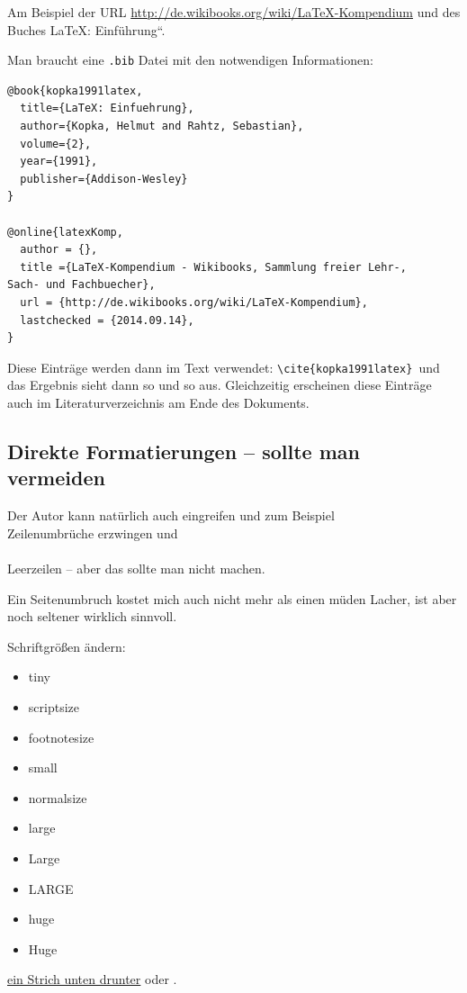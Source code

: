 Am Beispiel der URL \url{http://de.wikibooks.org/wiki/LaTeX-Kompendium}
und des Buches \quotedblbase \LaTeX{}: Einführung``.

Man braucht eine \texttt{.bib} Datei mit den notwendigen Informationen:

\begin{lstlisting}[language={[LaTeX]TeX}]
@book{kopka1991latex,
  title={LaTeX: Einfuehrung},
  author={Kopka, Helmut and Rahtz, Sebastian},
  volume={2},
  year={1991},
  publisher={Addison-Wesley} 
}

@online{latexKomp,
  author = {},
  title ={LaTeX-Kompendium - Wikibooks, Sammlung freier Lehr-, 
Sach- und Fachbuecher},
  url = {http://de.wikibooks.org/wiki/LaTeX-Kompendium},
  lastchecked = {2014.09.14},
}
\end{lstlisting}


Diese Einträge werden dann im Text verwendet: \texttt{\textbackslash{}cite\{kopka1991latex\}
}und das Ergebnis sieht dann so \citep{kopka1991latex} und so \citep{latexKomp}
aus. Gleichzeitig erscheinen diese Einträge auch im Literaturverzeichnis
am Ende des Dokuments.


\subsection{Direkte Formatierungen -- sollte man vermeiden}

Der Autor kann natürlich auch eingreifen und zum Beispiel\\
Zeilenumbrüche erzwingen und \\
\\
Leerzeilen -- aber das sollte man nicht machen. \newpage{}

Ein Seitenumbruch kostet mich auch nicht mehr als einen müden Lacher,
ist aber noch seltener wirklich sinnvoll.

Schriftgrößen ändern:
\begin{itemize}
\item {\tiny{}tiny} 
\item {\scriptsize{}scriptsize} 
\item {\footnotesize{}footnotesize} 
\item {\small{}small} 
\item normalsize 
\item {\large{}large} 
\item {\Large{}Large} 
\item {\LARGE{}LARGE} 
\item {\huge{}huge} 
\item {\Huge{}Huge} 
\end{itemize}

\uline{ein Strich unten drunter} oder .

